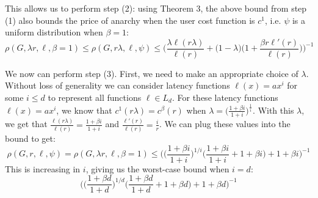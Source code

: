 \begin{proof-sketch}
    This allows us to perform step (2): using Theorem 3, the above bound from step (1) also bounds the price of anarchy when the user cost function is $c^1$, i.e. $\psi$ is a uniform distribution when $\beta = 1$:
    $$\rho(G,\lambda r,\ell,\beta=1) \le \rho(G,r\lambda, \ell, \psi) \le \Big(\frac{\lambda \ell(r\lambda)}{\ell(r)} + \Big(1-\lambda\Big)\Big(1+\frac{\beta r\ell'(r)}{\ell(r)}\Big)\Big)^{-1}$$

    We now can perform step (3). First, we need to make an appropriate choice of $\lambda$. Without loss of generality we can consider latency functions $\ell(x) = ax^i$ for some $i \le d$ to represent all functions $\ell \in L_d$. For these latency functions $\ell(x) = ax^i$, we know that 
    $c^1(r\lambda) = c^\beta(r)$ when $\lambda = \Big(\frac{1+\beta i}{1+i}\Big)^{\frac{1}{i}}$.
    With this $\lambda$, we get that $\frac{\ell(r\lambda)}{\ell(r)} = \frac{1+\beta i}{1+i}$ and $\frac{\ell'(r)}{\ell(r)} = \frac{i}{r}$. We can plug these values into the bound to get:
    $$\rho(G,r,\ell,\psi) = \rho(G,\lambda r, \ell,\beta=1) \le \Big(\Big(\frac{1+\beta i}{1+i}\Big)^{1/i}\Big(\frac{1+\beta i}{1+i} + 1 + \beta i\Big)+ 1 + \beta i\Big)^{-1}$$
    This is increasing in $i$, giving us the worst-case bound when $i=d$:
$$\Big(\Big(\frac{1+\beta d}{1+d}\Big)^{1/d}\Big(\frac{1+\beta d}{1+d} + 1 + \beta d\Big)+ 1 + \beta d\Big)^{-1}$$
\end{proof-sketch}

